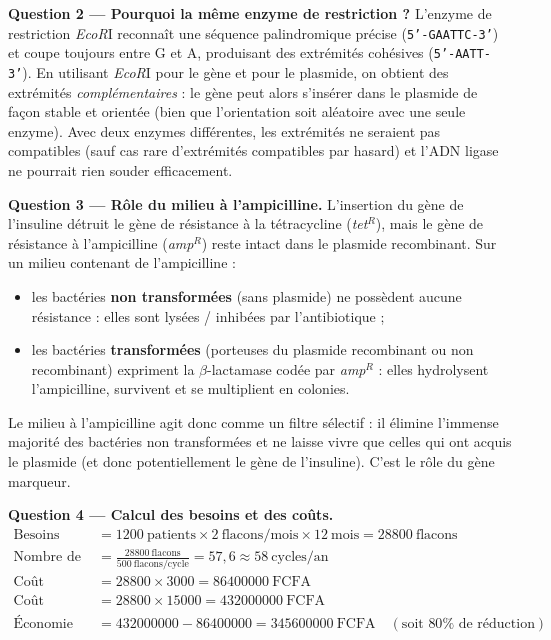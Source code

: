 \documentclass[11pt]{article}
\newcommand{\cle}[1]{{\popxbold\color{popdark}#1}}
\begin{document}
\begin{exoresolu}
\textbf{Question 2 — Pourquoi la même enzyme de restriction ?} L'enzyme de restriction \emph{EcoR}I reconnaît une séquence palindromique précise (\texttt{5'-GAATTC-3'}) et coupe toujours entre G et A, produisant des extrémités cohésives (\texttt{5'-AATT-3'}). En utilisant \emph{EcoR}I pour le gène et pour le plasmide, on obtient des extrémités \emph{complémentaires} : le gène peut alors s'insérer dans le plasmide de façon stable et orientée (bien que l'orientation soit aléatoire avec une seule enzyme). Avec deux enzymes différentes, les extrémités ne seraient pas compatibles (sauf cas rare d'extrémités compatibles par hasard) et l'ADN ligase ne pourrait rien souder efficacement.

\textbf{Question 3 — Rôle du milieu à l'ampicilline.} L'insertion du gène de l'insuline détruit le gène de résistance à la tétracycline (\textit{tet}$^R$), mais le gène de résistance à l'ampicilline (\textit{amp}$^R$) reste intact dans le plasmide recombinant. Sur un milieu contenant de l'ampicilline :
\begin{itemize}
\item les bactéries \textbf{non transformées} (sans plasmide) ne possèdent aucune résistance : elles sont lysées / inhibées par l'antibiotique ;
\item les bactéries \textbf{transformées} (porteuses du plasmide recombinant ou non recombinant) expriment la $\beta$-lactamase codée par \textit{amp}$^R$ : elles hydrolysent l'ampicilline, survivent et se multiplient en colonies.
\end{itemize}
Le milieu à l'ampicilline agit donc comme un \cle{filtre sélectif} : il élimine l'immense majorité des bactéries non transformées et ne laisse vivre que celles qui ont acquis le plasmide (et donc potentiellement le gène de l'insuline). C'est le rôle du \cle{gène marqueur}.

\textbf{Question 4 — Calcul des besoins et des coûts.}
\begin{align*}
\text{Besoins annuels en flacons} &= \num{1200}\ \text{patients} \times 2\ \text{flacons/mois} \times 12\ \text{mois} = \num{28800}\ \text{flacons} \\
\text{Nombre de cycles de culture} &= \frac{\num{28800}\ \text{flacons}}{500\ \text{flacons/cycle}} = 57{,}6 \approx 58\ \text{cycles/an} \\
\text{Coût annuel production locale} &= \num{28800} \times \num{3000} = \num{86400000}\ \text{FCFA} \\
\text{Coût annuel importation} &= \num{28800} \times \num{15000} = \num{432000000}\ \text{FCFA} \\
\text{Économie réalisée} &= \num{432000000} - \num{86400000} = \num{345600000}\ \text{FCFA} \quad (\text{soit } 80\% \text{ de réduction})
\end{align*}


\end{exoresolu}
\end{document}
